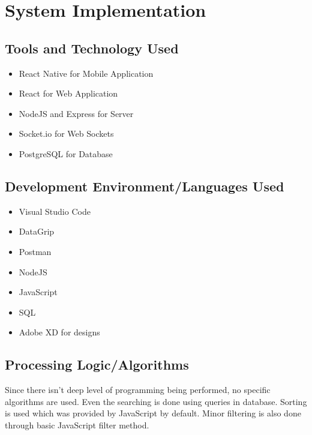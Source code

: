 \chapter{System Implementation} \label{chap:sysImplementation}

\section*{}
\section{Tools and Technology Used}
\begin{itemize}
    \item React Native for Mobile Application \cite{native}
    \item React for Web Application \cite{react}
    \item NodeJS and Express for Server \cite{express}
    \item Socket.io for Web Sockets \cite{socket}
    \item PostgreSQL for Database \cite{sql}
\end{itemize}
\section{Development Environment/Languages Used}
\begin{itemize}
    \item Visual Studio Code
    \item DataGrip
    \item Postman
    \item NodeJS
    \item JavaScript
    \item SQL
    \item Adobe XD for designs
\end{itemize}
\section{Processing Logic/Algorithms}
Since there isn't deep level of programming being performed, no specific algorithms are used. Even the searching is done using queries in database. Sorting is used which was provided by JavaScript by default. Minor filtering is also done through basic JavaScript filter method.

